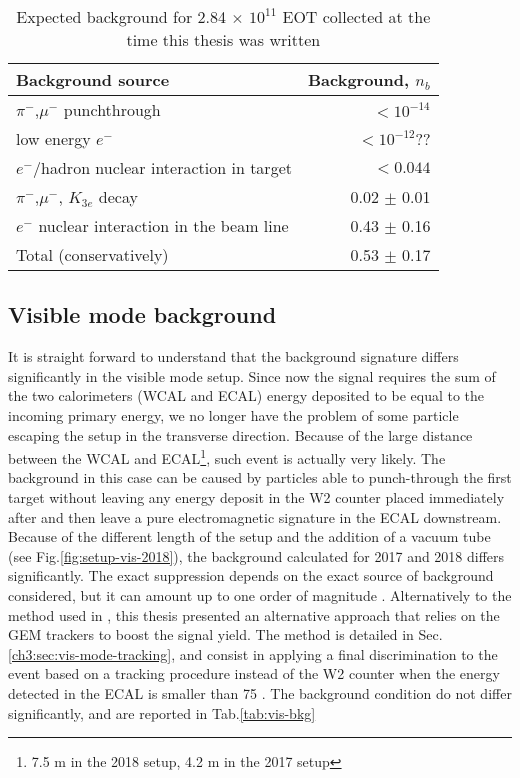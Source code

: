 \begin{table}[bth!]
  \centering
  \caption[Invisible mode background]{Expected background for 2.84 $\times$ $10^{11}$ EOT collected at the time this thesis was written \cite{NA64:2019imj}}
  \begin{tabular}{lr}
    \hline \hline
    Background source & Background, $n_b$ \\
    \hline
    $\pi^-$,$\mu^-$ punchthrough                      & $<10^{-14}$ \\
    low energy $e^-$                                  & $<10^{-12}$?? \\
    $e^-$/hadron nuclear interaction in target        & $<0.044$ \\
    $\pi^-$,$\mu^-$, $K_{3e}$ decay                    & 0.02 $\pm$ 0.01 \\
    $e^-$ nuclear interaction in the  beam line       & 0.43 $\pm$ 0.16 \\
    \hline
    Total (conservatively)                            & 0.53 $\pm$ 0.17 \\
    \hline \hline                       
  \end{tabular}
  \label{tab:inv-bkg}
\end{table}

\subsection{Visible mode background}

It is straight forward to understand that the background signature differs significantly in the visible mode setup. Since now the signal requires the sum of the two calorimeters (WCAL and ECAL) energy deposited to be equal to the incoming primary energy, we no longer have the problem of some particle escaping the setup in the transverse direction. Because of the large distance between the WCAL and ECAL\footnote{7.5 \si{\meter} in the 2018 setup, 4.2 \si{\meter} in the 2017 setup}, such event is actually very likely. The background in this case can be caused by particles able to punch-through the first target without leaving any energy deposit in the W2 counter placed immediately after and then leave a pure electromagnetic signature in the ECAL downstream. Because of the different length of the setup and the addition of a vacuum tube (see Fig.\ref{fig:setup-vis-2018}), the background calculated for 2017 and 2018 differs significantly. The exact suppression depends on the exact source of background considered, but it can amount up to one order of magnitude \cite{Banerjee:2019hmi}. Alternatively to the method used in \cite{Banerjee:2019hmi}, this thesis presented an alternative approach that relies on the GEM trackers to boost the signal yield. The method is detailed in Sec.\ref{ch3:sec:vis-mode-tracking}, and consist in applying a final discrimination to the event based on a tracking procedure instead of the W2 counter when the energy detected in the ECAL is smaller than 75 \gev. The background condition do not differ significantly, and are reported in Tab.\ref{tab:vis-bkg}


